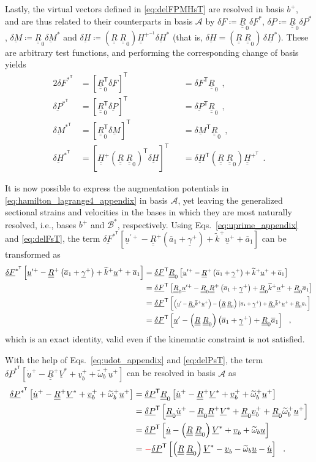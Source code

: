 \documentclass[12pt,a4paper,oneside,english]{abntex2} %
\newcommand{\fix}[1]{{\color{red}#1}}
\newcommand{\vect}[1]{\underline{#1}}
\newcommand{\uvec}[1]{\overline{#1}}
\def\tens#1{\underline{\underline{#1}}}
\def\til#1{\widetilde{#1}}
\def\lb{\left[}
\def\rb{\right]}
\def\lp{\left(}
\def\rp{\right)}
\def\T{\mathsf{T}}
\def\A{\mathcal{A}}
\def\bp{b^+}
\def\B*{\mathcal{B}^*}
\def\aone{\uvec{a}_1}
\def\R{\tens{R}}
\def\Rp{\R^+}
\def\Rz{\R_0}
\def\RzT{\R^\T_0}
\def\u{\vect{u}}
\def\uplus{\u^{+}}
\def\udot{\dot{\u}}
\def\updot{\dot{\u}^{+}}
\def\uprime{\u^{\prime}}
\def\upprime{\u^{\prime+}}
\def\vb{\vect{v}_b}
\def\vbplus{\vb^{+}}
\def\omtil{\til{\omega}_b}
\def\omtilp{\omtil^{+}}
\def\gam{\vect{\gamma}}
\def\gamp{\gam^{+}}
\def\ktil{\til{k}}
\def\ktilp{\ktil^{+}}
\def\V{\vect{V}}
\def\Vs{\V^{*}}
\def\Hv{\vect{H}}
\def\Hvs{\Hv^*}
\def\H{\tens{H}}
\def\Hp{\H^{+}}
\def\HpT{\H^{+^\T}}
\def\Hpinv{\H^{+^{-1}}}
\def\delF{\vect{\delta F}}
\def\delFT{\delF^\T}
\def\delM{\vect{\delta M}}
\def\delMT{\delM^\T}
\def\delP{\vect{\delta P}}
\def\delPT{\delP^\T}
\def\delH{\vect{\delta H}}
\def\delHT{\delH^\T}
\def\delFs{\delF^*}
\def\delFsT{\delF^{*^\T}}
\def\delMs{\delM^*}
\def\delMsT{\delM^{*^\T}}
\def\delPs{\delP^*}
\def\delPsT{\delP^{*^\T}}
\def\delHs{\delH^*}
\def\delHsT{\delH^{*^\T}}
\def\RRz{\lp\R\;\Rz\rp}
\def\RRzT{\RRz^\T}
\begin{document}
\begin{apendicesenv}
Lastly, \fix{the virtual vectors defined in \cref{eq:delFPMHsT} are resolved in basis $\bp$, and are thus related to their counterparts in basis $\A$ by $\delF\coloneqq\Rz\delFs$, $\delP\coloneqq\Rz\delPs$, $\delM\coloneqq\Rz\delMs$ and $\delH\coloneqq\RRz\Hpinv\delHs$ (that is, $\delH=\RRz\,\delta\Hvs$). These are arbitrary test functions, and} performing the corresponding change of basis yields
\begin{alignat}{2}
    \delFsT &= \lb\RzT\delF\rb^\T &&= \delFT\Rz
    \ \ , \label{eq:delFsT}  
    \\
    \delPsT &= \lb\RzT\delP\rb^\T &&= \delPT\Rz
    \ \ , \label{eq:delPsT}  
    \\
    \delMsT &= \lb\RzT\delM\rb^\T &&= \delMT\Rz
    \ \ , \label{eq:delMsT}  
    \\
    \delHsT &= \lb\Hp\RRzT\delH\rb^\T &&= \delHT\RRz\HpT
    \ \ . \label{eq:delHsT} 
\end{alignat}

It is now possible to express the augmentation potentials in \cref{eq:hamilton_lagrange4_appendix} in basis $\A$, yet leaving the generalized sectional strains and velocities in the bases in which they are most naturally resolved, i.e., bases $\bp$ and $\B*$, respectively. Using Eqs.~\eqref{eq:uprime_appendix} and \eqref{eq:delFsT}, the term $\delFsT\lb\upprime-\Rp\lp\aone+\gamp\rp+\ktilp\uplus+\aone\rb$ can be transformed as
\begin{align}
    \delFsT\lb\upprime-\Rp\lp\aone+\gamp\rp+\ktilp\uplus+\aone\rb &= \delFT\Rz\lb \scalebox{0.9}{$\displaystyle \upprime-\Rp\lp\aone+\gamp\rp+\ktilp\uplus+\aone$}\rb 
    \nonumber 
    \\
    &=\delFT\lb \scalebox{0.9}{$\displaystyle \Rz\upprime - \Rz\Rp\lp\aone+\gamp\rp + \Rz\ktilp\uplus + \Rz\aone$} \rb
    \nonumber 
    \\
    &=\delFT\lb \scalebox{0.7}{$\displaystyle \lp\uprime-\Rz\ktilp\uplus\rp - \RRz\lp\aone+\gamp\rp + \Rz\ktilp\uplus + \Rz\aone$} \rb
    \nonumber 
    \\
    &=\delFT\lb \uprime - \RRz\lp\aone+\gamp\rp + \Rz\aone \rb \ \ ,
    \label{eq:delF_transform}
\end{align}
\fix{which is an exact identity, valid even if the kinematic constraint is not satisfied.}

With the help of Eqs.~\eqref{eq:udot_appendix} and \eqref{eq:delPsT}, the term $\delPsT\lb\updot - \Rp\Vs + \vbplus + \omtilp\uplus\rb$ can be resolved in basis $\A$ as
\begin{align}
    \delPsT\lb\updot-\Rp\Vs+\vbplus+\omtilp\uplus\rb &= 
    \delPT\Rz\lb\updot-\Rp\Vs+\vbplus+\omtilp\uplus\rb
    \nonumber 
    \\
    &= 
    \delPT\lb \Rz\updot - \Rz\Rp\Vs + \Rz\vbplus + \Rz\omtilp\uplus \rb 
    \nonumber 
    \\
    &=\delPT\lb \udot - \RRz\Vs + \vb + \omtil\u \rb 
    \nonumber 
    \\
    &=\fix{-}\delPT\lb \RRz\Vs - \vb - \omtil\u - \udot \rb \ \ .
    \label{eq:delP_transform}
\end{align}


\end{apendicesenv}
\end{document}
